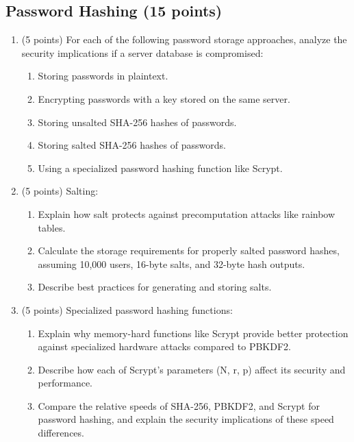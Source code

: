 \documentclass[10pt,a4paper,american]{exam}
\begin{document}
\subsection{Password Hashing (15 points)}

\begin{enumerate}
	\item (5 points) For each of the following password storage approaches, analyze the security implications if a server database is compromised:
	      \begin{enumerate}
		      \item Storing passwords in plaintext.
		      \item Encrypting passwords with a key stored on the same server.
		      \item Storing unsalted SHA-256 hashes of passwords.
		      \item Storing salted SHA-256 hashes of passwords.
		      \item Using a specialized password hashing function like Scrypt.
	      \end{enumerate}

	\item (5 points) Salting:
	      \begin{enumerate}
		      \item Explain how salt protects against precomputation attacks like rainbow tables.
		      \item Calculate the storage requirements for properly salted password hashes, assuming 10,000 users, 16-byte salts, and 32-byte hash outputs.
		      \item Describe best practices for generating and storing salts.
	      \end{enumerate}

	\item (5 points) Specialized password hashing functions:
	      \begin{enumerate}
		      \item Explain why memory-hard functions like Scrypt provide better protection against specialized hardware attacks compared to PBKDF2.
		      \item Describe how each of Scrypt's parameters (N, r, p) affect its security and performance.
		      \item Compare the relative speeds of SHA-256, PBKDF2, and Scrypt for password hashing, and explain the security implications of these speed differences.
	      \end{enumerate}
\end{enumerate}
\end{document}
